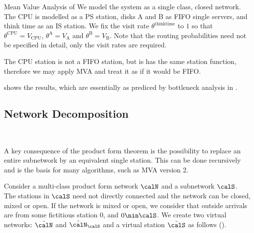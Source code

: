 \begin{ex}{Mean Value Analysis of }
We model the system as a single class, closed
network. The CPU is modelled as a PS station,
disks A and B as FIFO single servers, and think
time as an IS station. We fix the visit rate
$\theta^{\mathrm{think time}}$ to $1$ so that
$\theta^{\mathrm{CPU}}=V_{\mbox{CPU}}$,
$\theta^{\mathrm{A}}=V_{\mbox{A}}$ and
$\theta^{\mathrm{B}}=V_{\mbox{B}}$. Note that the
routing probabilities need not be specified in
detail, only the visit rates are required.

The CPU station is not a FIFO station, but is has
the same station function, therefore we may apply
MVA and treat it as if it would be FIFO.

 shows the results, which
are essentially as prediced by bottleneck
analysis in .

\label{ex-q-qnet-djerzcbasvvajhqoejfz}
\end{ex}

\subsection{Network Decomposition}
\begin{figure}[htbp]
\center
   \\
\end{figure}


A key consequence of the product form theorem is
the possibility to replace an entire subnetwork
by an equivalent single station. This can be done
recursively and is the basis for many algorithms,
such as MVA version 2.

Consider a multi-class product form network
$\calN$ and a subnetwork $\calS$. The stations in
$\calS$ need not directly connected and the
network can be closed, mixed or open. If the
network is mixed or open, we consider that
outside arrivals are from some fictitious station
$0$, and $0\nin \calS$. We create two virtual
networks: $\tilde{\calN}$ and
$\tilde{\calN}_{\calS}$ and a virtual station
$\tilde{\calS}$ as follows
().

